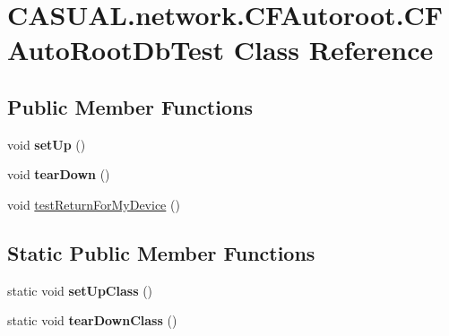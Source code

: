 \hypertarget{classCASUAL_1_1network_1_1CFAutoroot_1_1CFAutoRootDbTest}{\section{C\-A\-S\-U\-A\-L.\-network.\-C\-F\-Autoroot.\-C\-F\-Auto\-Root\-Db\-Test Class Reference}
\label{classCASUAL_1_1network_1_1CFAutoroot_1_1CFAutoRootDbTest}
}
\subsection*{Public Member Functions}
\begin{DoxyCompactItemize}
\item 
\hypertarget{classCASUAL_1_1network_1_1CFAutoroot_1_1CFAutoRootDbTest_a11d8d12096300b7f2543d6299246f6f8}{void {\bfseries set\-Up} ()}\label{classCASUAL_1_1network_1_1CFAutoroot_1_1CFAutoRootDbTest_a11d8d12096300b7f2543d6299246f6f8}

\item 
\hypertarget{classCASUAL_1_1network_1_1CFAutoroot_1_1CFAutoRootDbTest_a70bd64859e68018964674d4a7b8fe66e}{void {\bfseries tear\-Down} ()}\label{classCASUAL_1_1network_1_1CFAutoroot_1_1CFAutoRootDbTest_a70bd64859e68018964674d4a7b8fe66e}

\item 
void \hyperlink{classCASUAL_1_1network_1_1CFAutoroot_1_1CFAutoRootDbTest_a45ed8030ea4361f9960b0f50ebfed09e}{test\-Return\-For\-My\-Device} ()
\end{DoxyCompactItemize}
\subsection*{Static Public Member Functions}
\begin{DoxyCompactItemize}
\item 
\hypertarget{classCASUAL_1_1network_1_1CFAutoroot_1_1CFAutoRootDbTest_a32e29eb562ac0c1d8d214f4af747bcd1}{static void {\bfseries set\-Up\-Class} ()}\label{classCASUAL_1_1network_1_1CFAutoroot_1_1CFAutoRootDbTest_a32e29eb562ac0c1d8d214f4af747bcd1}

\item 
\hypertarget{classCASUAL_1_1network_1_1CFAutoroot_1_1CFAutoRootDbTest_ac55b6d3e98c4d036e7cd06118b1614c0}{static void {\bfseries tear\-Down\-Class} ()}\label{classCASUAL_1_1network_1_1CFAutoroot_1_1CFAutoRootDbTest_ac55b6d3e98c4d036e7cd06118b1614c0}

\end{DoxyCompactItemize}


